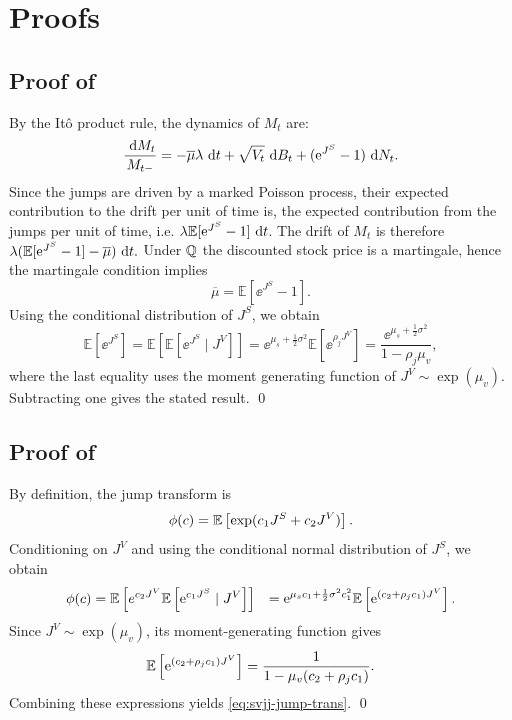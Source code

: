 \chapter{Proofs}
\section{Proof of \texorpdfstring{}{SVJJ MG Cond}}
\label{app:proof-mg-cond}
  By the Itô product rule, the dynamics of $M_t$ are:
  \[
    \frac{\text{ d} M_t}{M_{t-}} = -\overline{\mu}\lambda\text{ d} t +\sqrt{V_t}\text{ d} B_t +(\text{e}^{J^S}-1)\text{ d} N_t.
  \]
  Since the jumps are driven by a marked Poisson process, their expected contribution to the drift
  per unit of time is, the expected contribution from the jumps per unit of time, i.e.
  $\lambda\mathbb{E}[\text{e}^{J^S}-1]\text{ d} t$. The drift of $M_t$ is therefore $\lambda(
  \mathbb{E}[\text{e}^{J^S}-1]-\overline{\mu})\text{ d} t.$ Under $\mathbb{Q}$ the discounted stock price is a
  martingale, hence the martingale condition implies
  \[ 
    \overline{\mu}=\mathbb{E}[\ee^{J^S}-1].
  \]
  Using the conditional distribution of $J^S$, we obtain
  \[
    \mathbb{E}[\ee^{J^S}]
    =\mathbb{E}\left[ \mathbb{E}[\ee^{J^S}\mid J^V] \right]
    =\ee^{\mu_s+\frac{1}{2}\sigma^2} \mathbb{E}[\ee^{\rho_jJ^V}]
    =\frac{\ee^{\mu_s+\frac{1}{2}\sigma^2}} {1-\rho_j\mu_v},
  \]
  where the last equality uses the moment generating function of $J^{V} \sim \exp(\mu_v)$.
  Subtracting one gives the stated result.
\qed
\section{Proof of \texorpdfstring{}{SVJJ Jump transform}}
\label{app:proof-jump-trans}
By definition, the jump transform is
\[
\phi(c)=\mathbb{E}\left[\exp(c_1J^S+c_2J^V)\right].
\]
Conditioning on \(J^V\) and using the conditional normal distribution of \(J^S\), we obtain
\begin{align*}
\phi(c)
&=\mathbb{E}\left[ e^{c_2J^V} \mathbb{E}\left[\text{e}^{c_1J^S}\mid J^V\right] \right]
&=\text{e}^{\mu_sc_1+\frac12\sigma^2c_1^2} \mathbb{E}\left[\text{e}^{(c_2+\rho_jc_1)J^V}\right].
\end{align*}
Since $J^V\sim\exp(\mu_v)$, its moment-generating function gives
\[
\mathbb{E}\left[\text{e}^{(c_2+\rho_jc_1)J^V}\right] = \frac{1}{1-\mu_v(c_2+\rho_jc_1)}.
\]
Combining these expressions yields \eqref{eq:svjj-jump-trans}. 
\qed

